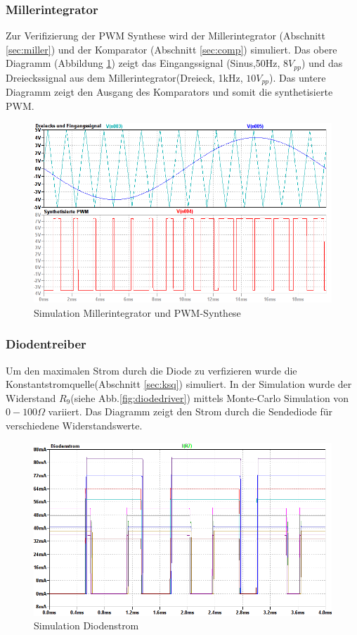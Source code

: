 \subsubsection{Millerintegrator}
\label{sec:simMiller}
Zur Verifizierung der PWM Synthese wird der Millerintegrator (Abschnitt \ref{sec:miller}) und der Komparator (Abschnitt \ref{sec:comp}) simuliert. Das obere Diagramm (Abbildung \ref{fig:pwmSynth}) zeigt das Eingangssignal (Sinus,50Hz, $8V_{pp}$) und das Dreieckssignal aus dem Millerintegrator(Dreieck, 1kHz, $10V_{pp}$). Das untere Diagramm zeigt den Ausgang des Komparators und somit die synthetisierte PWM.
\begin{figure}[H]
\centering
\includegraphics[scale=0.47]{gfx/simTx/PWMsynth.png}
\caption{Simulation Millerintegrator und PWM-Synthese}
	\label{fig:pwmSynth} 
\end{figure}
\subsubsection{Diodentreiber}
Um den maximalen Strom durch die Diode zu verfizieren wurde die Konstantstromquelle(Abschnitt \ref{sec:ksq}) simuliert. In der Simulation wurde der Widerstand $R_9$(siehe Abb.\ref{fig:diodedriver}) mittels Monte-Carlo Simulation von $0 - 100\Omega$ variiert. Das Diagramm zeigt den Strom durch die Sendediode für verschiedene Widerstandswerte.
\begin{figure}[H]
\centering
\includegraphics[scale=0.47]{gfx/simTx/DiodeCurrent.png}
\caption{Simulation Diodenstrom}
	\label{fig:diodeCurrent} 
\end{figure}

